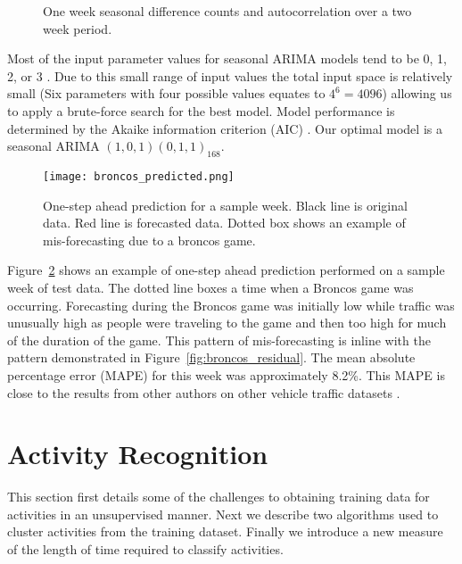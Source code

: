 \begin{figure}[t]
\begin{center}
\end{center}
\caption{One week seasonal difference counts and autocorrelation over a two week period.}
\label{fig:lag_data}
\end{figure}

Most of the input parameter values for seasonal ARIMA models tend to be 0, 1, 2, or 3 \cite{Box2008}.  Due to this small range of input values the total input space is relatively small (Six parameters with four possible values equates to $4^6 = 4096$) allowing us to apply a brute-force search for the best model.  Model performance is determined by the Akaike information criterion (AIC) \cite{Akaike1974}.  Our optimal model is a seasonal ARIMA $(1,0,1)(0,1,1)_{168}$.  

\begin{figure}[h]
\begin{center}
\texttt{[image: broncos\_predicted.png]}
\end{center}
\caption{One-step ahead prediction for a sample week.  Black line is original data.  Red line is forecasted data.  Dotted box shows an example of mis-forecasting due to a broncos game.}
\label{fig:arima_prediction}
\end{figure}

Figure~\ref{fig:arima_prediction} shows an example of one-step ahead prediction performed on a sample week of test data.  The dotted line boxes a time when a Broncos game was occurring.  Forecasting during the Broncos game was initially low while traffic was unusually high as people were traveling to the game and then too high for much of the duration of the game.  This pattern of mis-forecasting is inline with the pattern demonstrated in Figure~\ref{fig:broncos_residual}.  The mean absolute percentage error (MAPE) for this week was approximately 8.2\%.  This MAPE is close to the results from other authors on other vehicle traffic datasets \cite{Williams2003,Smith1997}.  

\section{Activity Recognition}
This section first details some of the challenges to obtaining training data for activities in an unsupervised manner.  Next we describe two algorithms used to cluster activities from the training dataset.  Finally we introduce a new measure of the length of time required to classify activities.

